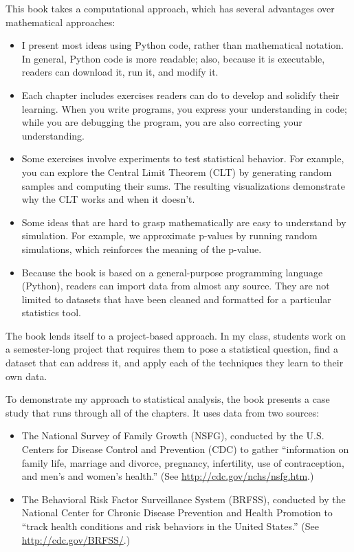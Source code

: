 \documentclass[]{book}
\providecommand{\tightlist}{%
  \setlength{\itemsep}{0pt}\setlength{\parskip}{0pt}}
\begin{document}
This book takes a computational approach, which has several advantages
over mathematical approaches:

\begin{itemize}
\tightlist
\item
  I present most ideas using Python code, rather than mathematical
  notation. In general, Python code is more readable; also, because it
  is executable, readers can download it, run it, and modify it.
\item
  Each chapter includes exercises readers can do to develop and
  solidify their learning. When you write programs, you express your
  understanding in code; while you are debugging the program, you are
  also correcting your understanding.
\item
  Some exercises involve experiments to test statistical behavior. For
  example, you can explore the Central Limit Theorem (CLT) by
  generating random samples and computing their sums. The resulting
  visualizations demonstrate why the CLT works and when it doesn't.
\item
  Some ideas that are hard to grasp mathematically are easy to
  understand by simulation. For example, we approximate p-values by
  running random simulations, which reinforces the meaning of the
  p-value.
\item
  Because the book is based on a general-purpose programming language
  (Python), readers can import data from almost any source. They are
  not limited to datasets that have been cleaned and formatted for a
  particular statistics tool.
\end{itemize}

The book lends itself to a project-based approach. In my class, students
work on a semester-long project that requires them to pose a statistical
question, find a dataset that can address it, and apply each of the
techniques they learn to their own data.

To demonstrate my approach to statistical analysis, the book presents a
case study that runs through all of the chapters. It uses data from two
sources:

\begin{itemize}
\tightlist
\item
  The National Survey of Family Growth (NSFG), conducted by the U.S.
  Centers for Disease Control and Prevention (CDC) to gather
  ``information on family life, marriage and divorce, pregnancy,
  infertility, use of contraception, and men's and women's health.''
  (See \url{http://cdc.gov/nchs/nsfg.htm}.)
\item
  The Behavioral Risk Factor Surveillance System (BRFSS), conducted by
  the National Center for Chronic Disease Prevention and Health
  Promotion to ``track health conditions and risk behaviors in the
  United States.'' (See \url{http://cdc.gov/BRFSS/}.)
\end{itemize}
\end{document}
